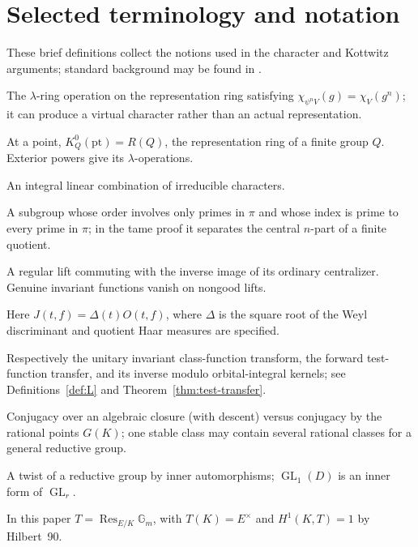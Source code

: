 \documentclass[11pt]{article}
\newcommand{\GL}{\operatorname{GL}}
\theoremstyle{plain}
\theoremstyle{definition}
\begin{document}
\section{Selected terminology and notation}\label{sec:glossary}
These brief definitions collect the notions used in the character and
Kottwitz arguments; standard background may be found in
\cite{Atiyah66,SegalK,Kottwitz84,MilneADT}.
\begin{description}[style=nextline,leftmargin=2.7cm,labelwidth=2.5cm,font=\normalfont\bfseries]
\item[Adams operation $\psi^n$]
The $\lambda$-ring operation on the representation ring satisfying
$\chi_{\psi^nV}(g)=\chi_V(g^n)$; it can produce a virtual character
rather than an actual representation.
\item[Equivariant $K$-theory]
At a point, $K_Q^0(\mathrm{pt})=R(Q)$, the representation ring
of a finite group $Q$. Exterior powers give its $\lambda$-operations.
\item[Virtual character]
An integral linear combination of irreducible characters.
\item[Hall $\pi$-subgroup]
A subgroup whose order involves only primes in $\pi$ and whose
index is prime to every prime in $\pi$; in the tame proof it
separates the central $n$-part of a finite quotient.
\item[Good element]
A regular lift commuting with the inverse image of its ordinary
centralizer. Genuine invariant functions vanish on nongood lifts.
\item[Normalized orbital integral]
Here $J(t,f)=\Delta(t)O(t,f)$, where $\Delta$ is the square root
of the Weyl discriminant and quotient Haar measures are specified.
\item[Transforms $L_D,\mathcal O_D,\mathcal B$]
Respectively the unitary invariant class-function transform, the
forward test-function transfer, and its inverse modulo orbital-integral
kernels; see Definitions~\ref{def:L} and Theorem~\ref{thm:test-transfer}.
\item[Stable/rational conjugacy]
Conjugacy over an algebraic closure (with descent) versus conjugacy
by the rational points $G(K)$; one stable class may contain several
rational classes for a general reductive group.
\item[Inner form]
A twist of a reductive group by inner automorphisms;
$\GL_1(D)$ is an inner form of $\GL_r$.
\item[Induced torus]
In this paper $T=\operatorname{Res}_{E/K}\mathbb G_m$,
with $T(K)=E^\times$ and $H^1(K,T)=1$ by Hilbert~90.

\end{description}
\end{document}
